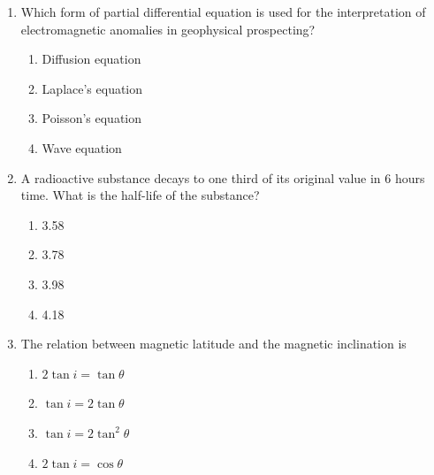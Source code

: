 \documentclass[journal,12pt,onecolumn]{IEEEtran}
\theoremstyle{remark}
\begin{document}
\begin{enumerate}
\newpage

    \item Which form of partial differential equation is used for the interpretation of electromagnetic anomalies in geophysical prospecting?

    \hfill{}
    
    \begin{multicols}{2}
        \begin{enumerate}
            \item Diffusion equation
            \item Laplace's equation
            \item Poisson's equation
            \item Wave equation
        \end{enumerate}
    \end{multicols}

    \item A radioactive substance decays to one third of its original value in 6 hours time. What is the half-life  of the substance?

    \hfill{}
    
    \begin{multicols}{4}
        \begin{enumerate}
            \item 3.58
            \item 3.78
            \item 3.98
            \item 4.18
        \end{enumerate}
    \end{multicols}

    \item The relation between magnetic latitude \brak{\text{$\theta$}} and the magnetic inclination  is

    \hfill{}
    
    \begin{multicols}{2}
        \begin{enumerate}
            \item $2 \tan i = \tan \theta$
            \item $\tan i = 2 \tan \theta$
            \item $\tan i = 2 \tan^{2}\theta$
            \item $2 \tan i = \cos \theta$
        \end{enumerate}
    \end{multicols}


\end{enumerate}
\end{document}
